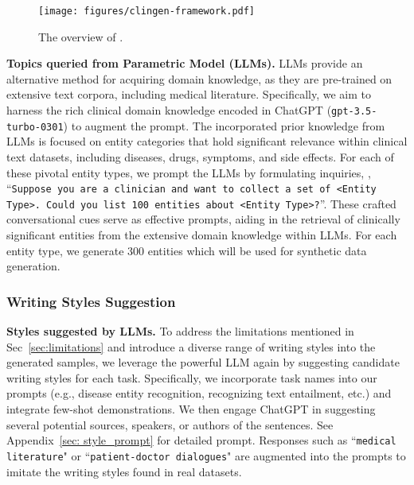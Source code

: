 \begin{figure}[t]
    \centering
    \vspace{-4ex}
    \texttt{[image: figures/clingen-framework.pdf]}
    \caption{The overview of \ours. \vspace{-2.5ex}
    }
    \label{fig:overall}
\end{figure}

\textbf{Topics queried from Parametric Model (LLMs).} 
LLMs provide an alternative method for acquiring domain knowledge, as they are pre-trained on extensive text corpora, including medical literature.
Specifically, we aim to harness the rich clinical domain knowledge encoded in ChatGPT (\texttt{gpt-3.5-turbo-0301}) to augment the prompt. 
The incorporated prior knowledge from LLMs is focused on entity categories that hold significant relevance within clinical text datasets, including diseases, drugs, symptoms, and side effects.
For each of these pivotal entity types, we prompt the LLMs by formulating inquiries, \eg, ``\texttt{Suppose you are a clinician and want to collect a set of <Entity Type>. Could you list 100 entities about <Entity Type>?}''. These crafted conversational cues serve as effective prompts, aiding in the retrieval of clinically significant entities from the extensive domain knowledge within LLMs. For each entity type, we generate 300 entities which will be used for synthetic data generation.

\vspace{-0.5ex}
\subsubsection{Writing Styles Suggestion}
\vspace{-0.5ex}
\textbf{Styles suggested by LLMs.} To address the limitations mentioned in Sec~\ref{sec:limitations} and introduce a diverse range of writing styles into the generated samples, we leverage the powerful LLM again by suggesting candidate writing styles for each task. Specifically, we incorporate task names into our prompts (e.g., disease entity recognition, recognizing text entailment, etc.) and integrate few-shot demonstrations. We then engage ChatGPT in suggesting several potential sources, speakers, or authors of the sentences. See Appendix~\ref{sec: style_prompt} for detailed prompt. Responses such as ``\texttt{medical literature}" or ``\texttt{patient-doctor dialogues}" are augmented into the prompts to imitate the writing styles found in real datasets. 


